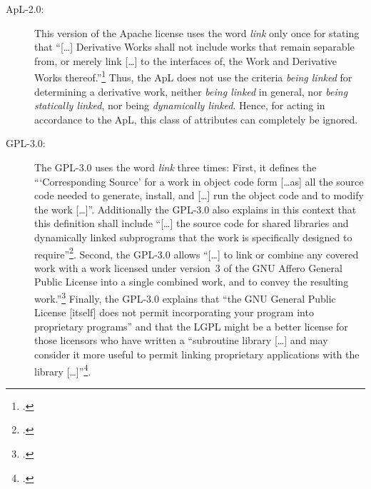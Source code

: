 \begin{description}

  \item[ApL-2.0:] This version of the Apache license uses the word \emph{link}
  only once for stating that \enquote{[\ldots] Derivative Works shall not
  include works that remain separable from, or merely link [\ldots] to the interfaces of, 
  the Work and Derivative Works thereof.}\footcite [cf.][\nopage wp.\
  §0]{Apl20OsiLicense2004a} Thus, the ApL does not use the criteria \emph{being
  linked} for determining a derivative work, neither \emph{being linked} in
  general, nor \emph{being statically linked}, nor being \emph{dynamically
  linked}. Hence, for acting in accordance to the ApL, this class of attributes
  can completely be ignored.

  \item[GPL-3.0:] The GPL-3.0 uses the word \emph{link} three times: First, it
  defines the \enquote{\enquote{Corresponding Source} for a work in object code
  form [\ldots as] all the source code needed to generate, install, and [\ldots]
  run the object code and to modify the work [\ldots]}. Additionally the GPL-3.0
  also explains in this context that this definition shall include
  \enquote{[\ldots] the source code for shared libraries and dynamically linked
  subprograms that the work is specifically designed to
  require}\footcite[cf.][\nopage wp.\ §0]{Gpl30OsiLicense2007a}. Second, the
  GPL-3.0 allows \enquote{[\ldots] to link or combine any covered work with a
  work licensed under version~3 of the GNU Affero General Public License into a
  single combined work, and to convey the resulting work.}\footcite[cf.][\nopage
  wp.\ §13]{Gpl30OsiLicense2007a} Finally, the GPL-3.0 explains that
  \enquote{the GNU General Public License [itself] does not permit incorporating
  your program into proprietary programs} and that the LGPL might be a better
  license for those licensors who have written a \enquote{subroutine library
  [\ldots] and may consider it more useful to permit linking proprietary
  applications with the library [\ldots]}\footcite[cf.][\nopage wp.\ last
  parapgraph]{Gpl30OsiLicense2007a}.
  

\end{description}

